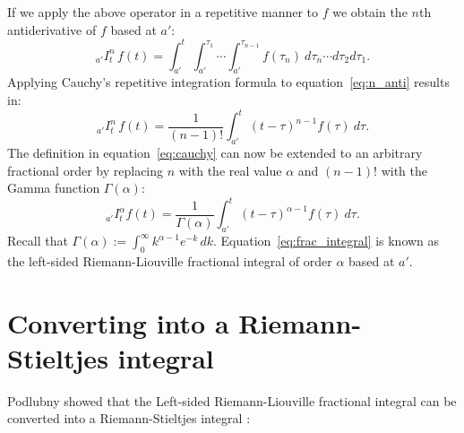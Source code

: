\documentclass[twoside,reqno,11pt]{fcaa-var} %
\begin{document}
\noindent
If we apply the above operator in a repetitive manner to $f$ we obtain the $n$th antiderivative of $f$ based at $a'$:
\begin{equation}
\label{eq:n_anti}
_{a'}I_t^n\,f(t) = \int_{a'}^t\int_{a'}^{\tau_1}\cdots \int_{a'}^{\tau_{n-1}}f(\tau_n)~d\tau_n\cdots d\tau_2 d\tau_1.
\end{equation}
Applying Cauchy's repetitive integration formula to equation~\eqref{eq:n_anti} results in:
\begin{equation}
\label{eq:cauchy}
_{a'}I_t^n\,f(t) = \frac{1}{(n-1)!}\int_{a'}^t (t-\tau)^{n-1}f(\tau)~d\tau.
\end{equation}
The definition in equation~\eqref{eq:cauchy} can now be extended to an arbitrary fractional order by replacing $n$ with the real value $\alpha$ and $(n-1)!$ with the Gamma function $\Gamma(\alpha)$:
\begin{equation}
\label{eq:frac_integral}
_{a'}I_t^{\alpha}f(t) = \frac{1}{\Gamma(\alpha)}\int_{a'}^t (t-\tau)^{\alpha-1}f(\tau)~d\tau.
\end{equation}
Recall that $\Gamma(\alpha) := \int_0^{\infty} k^{\alpha-1} e^{-k}\,dk$. Equation~\eqref{eq:frac_integral} is known as the left-sided Riemann-Liouville fractional integral of order $\alpha$ based at $a'$. 


\section{Converting into a Riemann-Stieltjes integral}
Podlubny showed that the Left-sided Riemann-Liouville fractional integral can be converted into a Riemann-Stieltjes integral \cite{podlubny02}:
\end{document}
